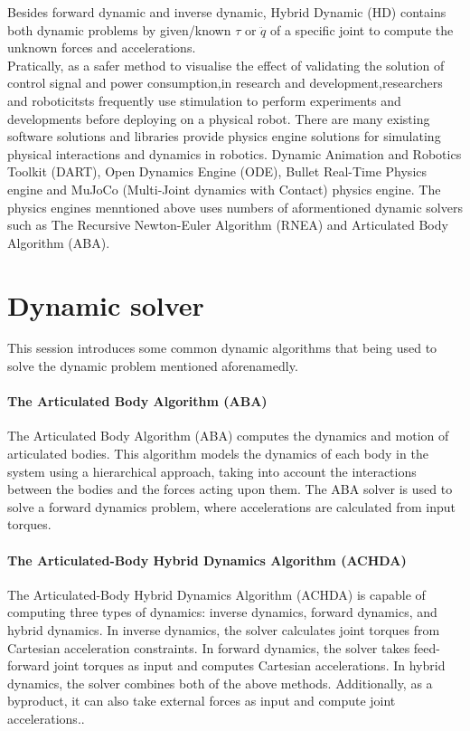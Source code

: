 \documentclass[report.tex]{subfiles}
\begin{document}
    Besides forward dynamic and inverse dynamic, Hybrid Dynamic (HD) contains both dynamic problems by given/known $\tau$ or $\ddot{q}$ of a specific joint to compute the unknown forces and accelerations.\\
    Pratically, as a safer method to visualise the effect of validating the solution of control signal and power consumption,in research and development,researchers and roboticitsts frequently use stimulation to perform experiments and developments before deploying on a physical robot. There are many existing software solutions and libraries provide physics engine solutions for simulating physical interactions and dynamics in robotics. Dynamic Animation and Robotics Toolkit (DART)\cite{Lee2018}, Open Dynamics Engine (ODE)\cite{ODE}, Bullet Real-Time Physics engine\cite{Admin_2022} and MuJoCo (Multi-Joint dynamics with Contact) physics engine\cite{MuJoCo}. The physics engines menntioned above uses numbers of aformentioned dynamic solvers such as The Recursive Newton-Euler Algorithm (RNEA) and Articulated Body Algorithm (ABA).

    \section{Dynamic solver}
    This session introduces some common dynamic algorithms that being used to solve the dynamic problem mentioned aforenamedly.

    \paragraph*{\large{The Articulated Body Algorithm (ABA)}\\ }
    The Articulated Body Algorithm (ABA) computes the dynamics and motion of articulated bodies. This algorithm models the dynamics of each body in the system using a hierarchical approach, taking into account the interactions between the bodies and the forces acting upon them. The ABA solver is used to solve a forward dynamics problem, where accelerations are calculated from input torques\cite{featherstone1999divide}. 
    \paragraph*{\large{The Articulated-Body Hybrid Dynamics Algorithm (ACHDA)}\\}
    The Articulated-Body Hybrid Dynamics Algorithm (ACHDA) is capable of computing three types of dynamics: inverse dynamics, forward dynamics, and hybrid dynamics. In inverse dynamics, the solver calculates joint torques from Cartesian acceleration constraints. In forward dynamics, the solver takes feed-forward joint torques as input and computes Cartesian accelerations. In hybrid dynamics, the solver combines both of the above methods. Additionally, as a byproduct, it can also take external forces as input and compute joint accelerations.\cite{featherstone2007book}.
\end{document}
